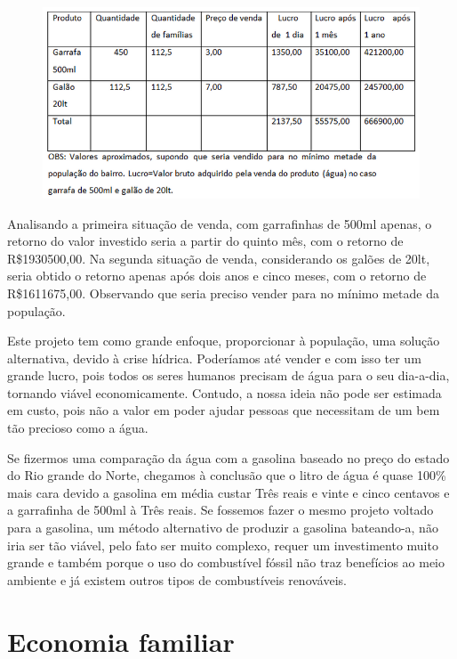       \FloatBarrier
	\begin{figure}[!h]
	    \centering
	    \includegraphics[scale = 0.6]{editaveis/figuras/estimativa_venda_2}
	    \label{estimativa_venda_2}
	\end{figure}
      \FloatBarrier
      
      Analisando a primeira situação de venda, com garrafinhas de 500ml apenas, o retorno do valor investido seria a partir do quinto mês, com o retorno de R\$1930500,00. Na segunda situação de venda, considerando os galões de 20lt, seria obtido o retorno apenas após dois anos e cinco meses, com o retorno de R\$1611675,00. Observando que seria preciso vender para no mínimo metade da população.
      
      Este projeto tem como grande enfoque, proporcionar à população, uma solução alternativa, devido à crise hídrica. Poderíamos até vender e com isso ter um grande lucro, pois todos os seres humanos precisam de água para o seu dia-a-dia, tornando viável economicamente. Contudo, a nossa ideia não pode ser estimada em custo, pois não a valor em poder ajudar pessoas que necessitam de um bem tão precioso como a água.
      
      Se fizermos uma comparação da água com a gasolina baseado no preço do estado do Rio grande do Norte, chegamos à conclusão que o litro de água é quase 100\% mais cara devido a gasolina em média custar Três reais e vinte e cinco centavos e a garrafinha de 500ml à Três reais. Se fossemos fazer o mesmo projeto voltado para a gasolina, um método alternativo de produzir a gasolina bateando-a, não iria ser tão viável, pelo fato ser muito complexo, requer um investimento muito grande e também porque o uso do combustível fóssil não traz benefícios ao meio ambiente e já existem outros tipos de combustíveis renováveis.  
      
   \section{Economia familiar}
   
